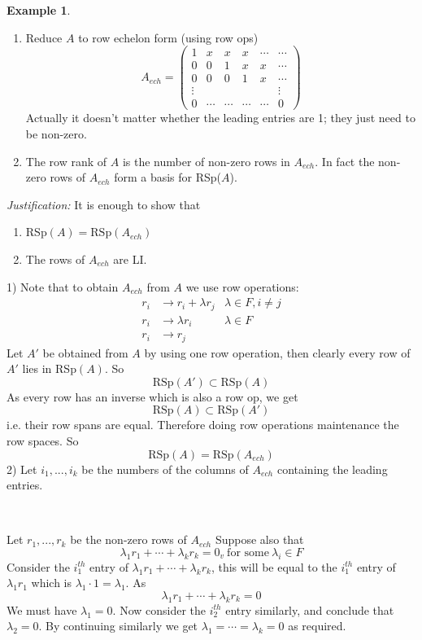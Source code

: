 \documentclass{report}
\theoremstyle{remark}
\theoremstyle{definition}
\theoremstyle{definition}
\newtheorem{example}[theorem]{Example}
\theoremstyle{theorem}
\begin{document}
\begin{example} \par
\begin{enumerate}
    \item Reduce $A$ to row echelon form (using row ops)
    \[A_{ech} = \begin{pmatrix}1&x&x&x&\cdots&\cdots\\
    0&0&1&x&x&\cdots\\
    0&0&0&1&x&\cdots\\
    \vdots&&&&&\vdots\\
    0&\cdots&\cdots&\cdots&\cdots&0
    \end{pmatrix} \]
    Actually it doesn't matter whether the leading entries are 1; they just need to be non-zero.
    \item The row rank of $A$ is the number of non-zero rows in $A_{ech}$. In fact the non-zero rows of $A_{ech}$ form a basis for RSp($A$).
\end{enumerate}
\emph{Justification:} It is enough to show that
\begin{enumerate}
    \item RSp$(A) = \text{RSp}(A_{ech})$
    \item The rows of $A_{ech}$ are LI.
\end{enumerate}
1) Note that to obtain $A_{ech}$ from $A$ we use row operations:
\begin{align*}
    r_i &\rightarrow r_i + \lambda r_j & \lambda \in F, i \neq j\\
    r_i &\rightarrow \lambda r_i & \lambda \in F\\
    r_i &\rightarrow r_j
\end{align*}
Let $A'$ be obtained from $A$ by using one row operation, then clearly every row of $A'$ lies in RSp$(A)$. So
\[\text{RSp}(A') \subset \text{RSp}(A)\]
As every row has an inverse which is also a row op, we get
\[\text{RSp}(A) \subset \text{RSp}(A')\]
i.e. their row spans are equal. Therefore doing row operations maintenance the row spaces. So
\[\text{RSp}(A) = \text{RSp}(A_{ech})\]
2) Let $i_1, ..., i_k$ be the numbers of the columns of $A_{ech}$ containing the leading entries.\\
\begin{table}[h!]
\centering
    \\
\end{table}

Let $r_1, ..., r_k$ be the non-zero rows of $A_{ech}$ Suppose also that
\[ \lambda_1 r_1 + \cdots + \lambda_k r_k = 0_v \> \text{for some} \> \lambda_i \in F\]
Consider the $i_1^{th}$ entry of $\lambda_1 r_1 + \cdots + \lambda_k r_k$, this will be equal to the $i^{th}_1$ entry of $\lambda_1 r_1$ which is $\lambda_1 \cdot 1 = \lambda_1$. As
\[ \lambda_1 r_1 + \cdots + \lambda_k r_k = 0\]
We must have $\lambda_1 = 0$. Now consider the $i_2^{th}$ entry similarly, and conclude that $\lambda_2 =0$. By continuing similarly we get $\lambda_1 = \cdots = \lambda_k =0$ as required.
\end{example}
\end{document}
